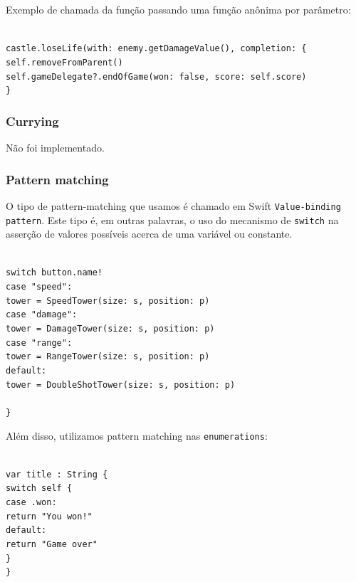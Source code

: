 \documentclass[rel_mlp]{iiufrgs}
\newcommand\tab[1][1cm]{\hspace*{#1}}
\begin{document}
Exemplo de chamada da função passando uma função anônima por parâmetro:

\texttt{
\\castle.loseLife(with: enemy.getDamageValue(), completion: \{
\\\tab self.removeFromParent()
\\\tab self.gameDelegate?.endOfGame(won: false, score: self.score)
\\\}
}


\subsubsection{Currying}

Não foi implementado.


\subsubsection{Pattern matching}

O tipo de pattern-matching que usamos é chamado em Swift \texttt{Value-binding pattern}. Este tipo é, em outras palavras, o uso do mecanismo de \texttt{switch} na asserção de valores possíveis acerca de uma variável ou constante.

\texttt{
\\switch button.name! {
\\\tab case "speed":
\\\tab\tab tower = SpeedTower(size: s, position: p)
\\\tab case "damage":
\\\tab\tab tower = DamageTower(size: s, position: p)
\\\tab case "range":
\\\tab\tab tower = RangeTower(size: s, position: p)
\\\tab default:
\\\tab\tab tower = DoubleShotTower(size: s, position: p)
\\\tab }
\\\}
}

Além disso, utilizamos pattern matching nas \texttt{enumerations}:

\texttt{
\\var title : String \{
\\\tab switch self \{
\\\tab\tab case .won:
\\\tab\tab\tab return "You won!"
\\\tab\tab default:
\\\tab\tab\tab return "Game over"
\\\tab \}
\\\}
}
\end{document}
